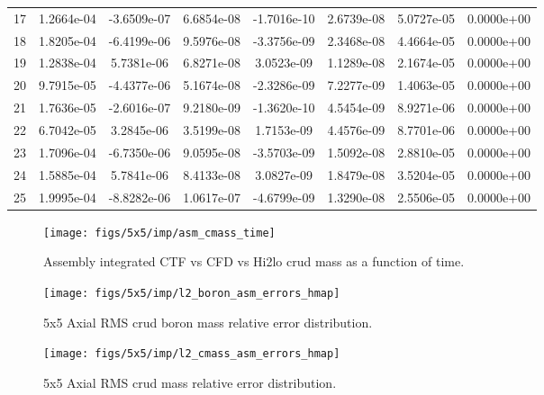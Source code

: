 \begin{table}[h]
\begin{center}
\begin{tabular}[h]{|c|c|c|c|c|c|c|c|}
17  & 1.2664e-04 & -3.6509e-07 & 6.6854e-08 & -1.7016e-10 & 2.6739e-08 & 5.0727e-05 & 0.0000e+00 \\
18  & 1.8205e-04 & -6.4199e-06 & 9.5976e-08 & -3.3756e-09 & 2.3468e-08 & 4.4664e-05 & 0.0000e+00 \\
19  & 1.2838e-04 & 5.7381e-06 & 6.8271e-08 & 3.0523e-09 & 1.1289e-08 & 2.1674e-05 & 0.0000e+00 \\
20  & 9.7915e-05 & -4.4377e-06 & 5.1674e-08 & -2.3286e-09 & 7.2277e-09 & 1.4063e-05 & 0.0000e+00 \\
21  & 1.7636e-05 & -2.6016e-07 & 9.2180e-09 & -1.3620e-10 & 4.5454e-09 & 8.9271e-06 & 0.0000e+00 \\
22  & 6.7042e-05 & 3.2845e-06 & 3.5199e-08 & 1.7153e-09 & 4.4576e-09 & 8.7701e-06 & 0.0000e+00 \\
23  & 1.7096e-04 & -6.7350e-06 & 9.0595e-08 & -3.5703e-09 & 1.5092e-08 & 2.8810e-05 & 0.0000e+00 \\
24  & 1.5885e-04 & 5.7841e-06 & 8.4133e-08 & 3.0827e-09 & 1.8479e-08 & 3.5204e-05 & 0.0000e+00 \\
25  & 1.9995e-04 & -8.8282e-06 & 1.0617e-07 & -4.6799e-09 & 1.3290e-08 & 2.5506e-05 & 0.0000e+00 \\
\hline
\end{tabular}
\label{tab:loo_rms}
\end{center}
\end{table}

\begin{figure}[H]
    \centering
    \texttt{[image: figs/5x5/imp/asm\_cmass\_time]}
    \caption{Assembly integrated CTF vs CFD vs Hi2lo crud mass as a function of time.}
    \label{fig:asmcmasstime}
\end{figure}

\begin{figure}[H]
    \centering
    \texttt{[image: figs/5x5/imp/l2\_boron\_asm\_errors\_hmap]}
    \caption{5x5 Axial RMS crud boron mass relative error distribution.}
    \label{fig:l2boronasmerrorshmap}
\end{figure}
\begin{figure}[H]
    \centering
    \texttt{[image: figs/5x5/imp/l2\_cmass\_asm\_errors\_hmap]}
    \caption{5x5 Axial RMS crud mass relative error distribution.}
    \label{fig:l2cmassasmerrorshmap}
\end{figure}


